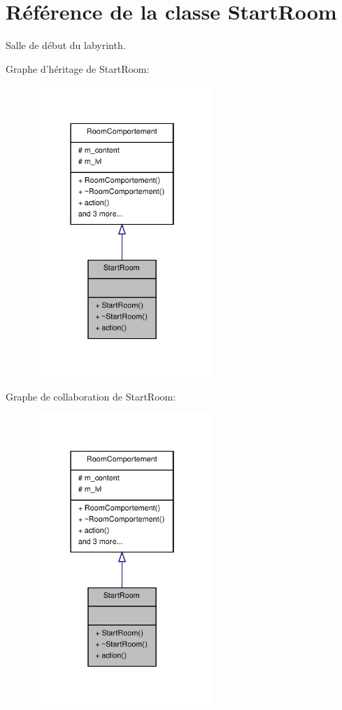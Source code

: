 \hypertarget{class_start_room}{\section{Référence de la classe Start\-Room}
\label{class_start_room}
}


Salle de début du labyrinth.  




Graphe d'héritage de Start\-Room\-:
\nopagebreak
\begin{figure}[H]
\begin{center}
\leavevmode
\includegraphics[width=190pt]{class_start_room__inherit__graph}
\end{center}
\end{figure}


Graphe de collaboration de Start\-Room\-:
\nopagebreak
\begin{figure}[H]
\begin{center}
\leavevmode
\includegraphics[width=190pt]{class_start_room__coll__graph}
\end{center}
\end{figure}
